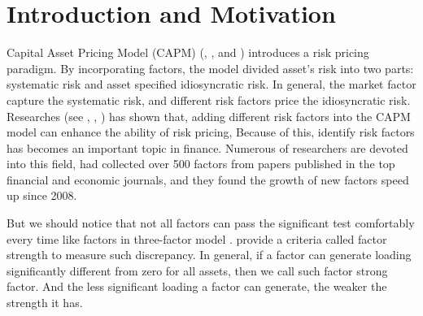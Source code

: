 


\section{Introduction and Motivation}
Capital Asset Pricing Model (CAPM) (, , and ) introduces a risk pricing paradigm.
By incorporating factors, the model divided asset's risk into two parts: systematic risk and asset specified idiosyncratic risk.
In general, the market factor capture the systematic risk, and different risk factors price the idiosyncratic risk.
Researches (see , , ) has shown that, adding different risk factors into the CAPM model can enhance the ability of risk pricing,
Because of this, identify risk factors has becomes an important topic in finance.
Numerous of researchers are devoted into this field,  had collected over 500 factors from papers published in the top financial and economic journals, and they found the growth of new factors speed up since 2008. 

But we should notice that not all factors can pass the significant test comfortably every time like factors in three-factor model \cite{Fama1992}.
 provide a criteria called factor strength to measure such discrepancy.
In general, if a factor can generate loading significantly different from zero for all assets, then we call such factor strong factor.
And the less significant loading a factor can generate, the weaker the strength it has.


